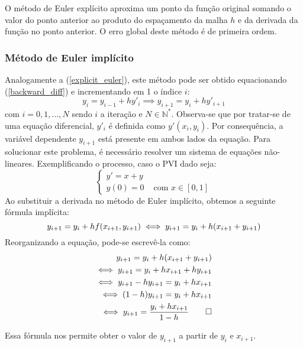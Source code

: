 O método de Euler explícito aproxima um ponto da função original somando o valor do ponto anterior ao produto do espaçamento da malha $h$ e da derivada da função no ponto anterior. O erro global deste método é de primeira ordem.

\subsubsection{Método de Euler implícito}\label{sec:implicit_euler} \quad

Analogamente a (\ref{explicit_euler}), este método pode ser obtido equacionando (\ref{backward_diff}) e incrementando em 1 o índice $i$:
\begin{equation}\label{implicit_euler}
	y_{i}= y_{i-1} + hy'_{i} \implies y_{i+1}= y_{i} + hy'_{i+1}
\end{equation}
com $i = 0, 1,...,N$ sendo $i$ a iteração e $N \in \mathbb{N}^*$. Observa-se que por tratar-se de uma equação diferencial, $y'_i$ é definida como $y'(x_i, y_i)$. Por consequência, a variável dependente $y_{i+1}$ está presente em ambos lados da equação. Para solucionar este problema, é necessário resolver um sistema de equações não-lineares.
Exemplificando o processo, caso o PVI dado seja:
\begin{equation*}
	\begin{cases}
		y' = x + y &                           \\
		y(0) = 0   & \text{ com } x \in [0, 1] 
	\end{cases}
\end{equation*}
Ao substituir a derivada no método de Euler implícito, obtemos a seguinte fórmula implícita:
\begin{equation*}
	y_{i+1} = y_i + h f(x_{i+1}, y_{i+1}) \\
	\iff y_{i+1} = y_i + h (x_{i+1} + y_{i+1})\\ 
\end{equation*}
Reorganizando a equação, pode-se escrevê-la como:
\begin{eqnarray*}
	y_{i+1} = y_i + h (x_{i+1} + y_{i+1})\\
	\iff y_{i+1} = y_i + hx_{i+1} + hy_{i+1}\\
	\iff y_{i+1} - hy_{i+1} = y_i + hx_{i+1}\\
	\iff (1-h)y_{i+1} = y_i + hx_{i+1}\\
	\iff y_{i+1} = \frac{y_i + hx_{i+1}}{1-h}\qedhere
\end{eqnarray*}

Essa fórmula nos permite obter o valor de $y_{i+1}$ a partir de $y_i$ e $x_{i+1}$.

